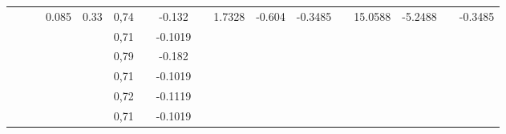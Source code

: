 \documentclass[a4paper,12pt]{article}
\begin{document}
\begin{landscape}
\begin{table}[]
\begin{tabular}{|c|c|c|c|c|c|c|c|c|c|c|c|c|c|c|c|c|}
                     &                           &                         & \multirow{10}{*}{0.085} & \multirow{10}{*}{0.33} & 0,74 &                         & -0.132  &                          & \multirow{10}{*}{1.7328} & \multirow{10}{*}{-0.604} & \multirow{10}{*}{-0.3485} &                        & \multirow{10}{*}{15.0588} & \multirow{10}{*}{-5.2488} &                         & \multirow{10}{*}{-0.3485} \\ \cline{6-6} \cline{8-8}
                     &                           &                         &                         &                        & 0,71 &                         & -0.1019 &                          &                          &                          &                           &                        &                           &                           &                         &                           \\ \cline{6-6} \cline{8-8}
                     &                           &                         &                         &                        & 0,79 &                         & -0.182  &                          &                          &                          &                           &                        &                           &                           &                         &                           \\ \cline{6-6} \cline{8-8}
                     &                           &                         &                         &                        & 0,71 &                         & -0.1019 &                          &                          &                          &                           &                        &                           &                           &                         &                           \\ \cline{6-6} \cline{8-8}
                     &                           &                         &                         &                        & 0,72 &                         & -0.1119 &                          &                          &                          &                           &                        &                           &                           &                         &                           \\ \cline{6-6} \cline{8-8}
                     &                           &                         &                         &                        & 0,71 &                         & -0.1019 &                          &                          &                          &                           &                        &                           &                           &                         &                           \\ \cline{6-6} \cline{8-8}

\end{tabular}
\end{table}
\end{landscape}
\end{document}
